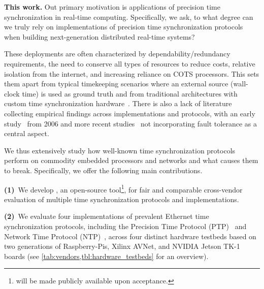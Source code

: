 \textbf{This work.}
Out primary motivation is applications of precision time synchronization in real-time computing.
Specifically, we ask, to what degree can we truly rely on implementations of precision time synchronization protocols
when building next-generation distributed real-time systems? %

These deployments %
are often %
characterized by dependability/redundancy requirements,
the need to conserve all types of resources to reduce costs,
relative isolation from the internet, %
and increasing reliance on COTS processors.
This sets them apart from typical timekeeping scenarios where an external source
(wall-clock time) is used as ground truth
and from traditional architectures with custom time synchronization hardware~\cite{wensley1978sift,hopkins1978ftmp}.
There is also a lack of literature collecting empirical findings
across implementations and protocols, with an early study~\cite{ntp-vs-ptp} from 2006
and more recent studies~\cite{time-enough} not incorporating fault tolerance as a central aspect.

We thus extensively study how well-known time synchronization protocols perform
on commodity embedded processors and networks and what causes them to break.
Specifically, we offer the following main contributions.

\textbf{(1)}~We develop \toolName{}, an open-source tool\footnote{\toolName{} will be made publicly available upon acceptance.}, for fair and comparable cross-vendor evaluation of multiple time synchronization protocols and implementations.

\textbf{(2)}~We evaluate %
four implementations of prevalent Ethernet time synchronization protocols, %
including the Precision Time Protocol (PTP)~\cite{ptp-spec} and Network Time Protocol (NTP)~\cite{ntpv4-spec},
across four distinct hardware testbeds
based on two generations of Raspberry-Pis,
Xilinx AVNet, and NVIDIA Jetson TK-1 boards (see \cref{tab:vendors,tbl:hardware_testbeds} for an overview).

